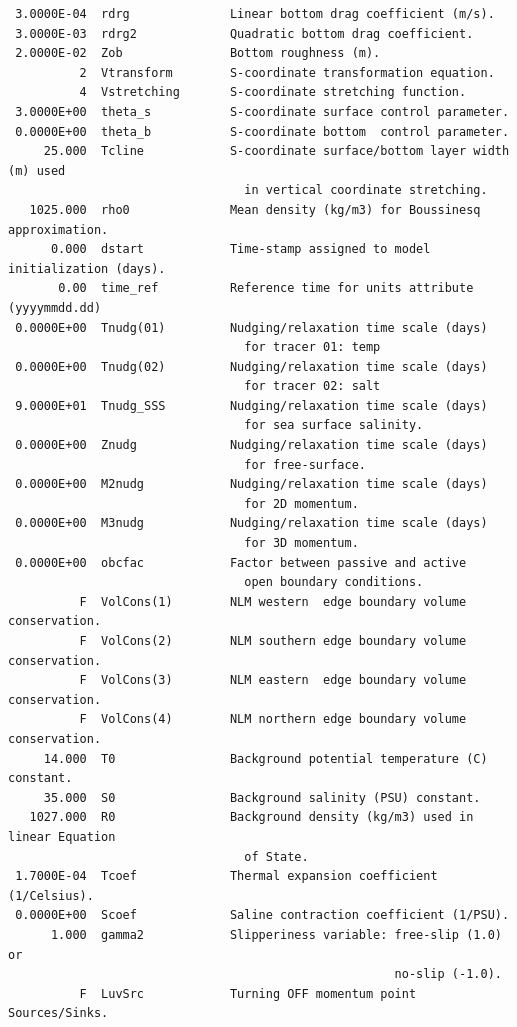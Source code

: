 \begin{verbatim}
 3.0000E-04  rdrg              Linear bottom drag coefficient (m/s).
 3.0000E-03  rdrg2             Quadratic bottom drag coefficient.
 2.0000E-02  Zob               Bottom roughness (m).
          2  Vtransform        S-coordinate transformation equation.
          4  Vstretching       S-coordinate stretching function.
 3.0000E+00  theta_s           S-coordinate surface control parameter.
 0.0000E+00  theta_b           S-coordinate bottom  control parameter.
     25.000  Tcline            S-coordinate surface/bottom layer width (m) used
                                 in vertical coordinate stretching.
   1025.000  rho0              Mean density (kg/m3) for Boussinesq approximation.
      0.000  dstart            Time-stamp assigned to model initialization (days).
       0.00  time_ref          Reference time for units attribute (yyyymmdd.dd)
 0.0000E+00  Tnudg(01)         Nudging/relaxation time scale (days)
                                 for tracer 01: temp
 0.0000E+00  Tnudg(02)         Nudging/relaxation time scale (days)
                                 for tracer 02: salt
 9.0000E+01  Tnudg_SSS         Nudging/relaxation time scale (days)
                                 for sea surface salinity.
 0.0000E+00  Znudg             Nudging/relaxation time scale (days)
                                 for free-surface.
 0.0000E+00  M2nudg            Nudging/relaxation time scale (days)
                                 for 2D momentum.
 0.0000E+00  M3nudg            Nudging/relaxation time scale (days)
                                 for 3D momentum.
 0.0000E+00  obcfac            Factor between passive and active
                                 open boundary conditions.
          F  VolCons(1)        NLM western  edge boundary volume conservation.
          F  VolCons(2)        NLM southern edge boundary volume conservation.
          F  VolCons(3)        NLM eastern  edge boundary volume conservation.
          F  VolCons(4)        NLM northern edge boundary volume conservation.
     14.000  T0                Background potential temperature (C) constant.
     35.000  S0                Background salinity (PSU) constant.
   1027.000  R0                Background density (kg/m3) used in linear Equation
                                 of State.
 1.7000E-04  Tcoef             Thermal expansion coefficient (1/Celsius).
 0.0000E+00  Scoef             Saline contraction coefficient (1/PSU).
      1.000  gamma2            Slipperiness variable: free-slip (1.0) or 
                                                      no-slip (-1.0).
          F  LuvSrc            Turning OFF momentum point Sources/Sinks.

\end{verbatim}
